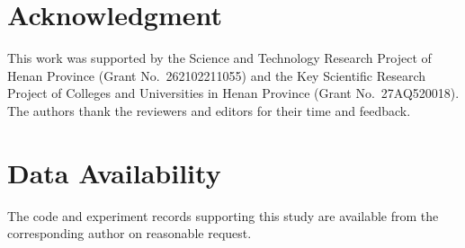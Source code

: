 \section*{Acknowledgment}

This work was supported by the Science and Technology Research Project of Henan
Province (Grant No.~262102211055) and the Key Scientific Research Project of
Colleges and Universities in Henan Province (Grant No.~27AQ520018). The authors
thank the reviewers and editors for their time and feedback.

\section*{Data Availability}

The code and experiment records supporting this study are available from the
corresponding author on reasonable request.
